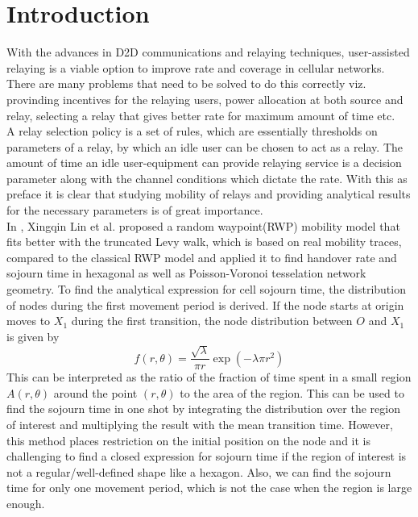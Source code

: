 \chapter{Introduction}
	With the advances in D2D communications and relaying techniques, user-assisted relaying is a viable option to improve rate and coverage in cellular networks. There are many problems that need to be solved to do this correctly viz. provinding incentives for the relaying users, power allocation at both source and relay, selecting a relay that gives better rate for maximum amount of time etc. \\ 


	A relay selection policy is a set of rules, which are essentially thresholds on parameters of a relay, by which an idle user can be chosen to act as a relay. The amount of time an idle user-equipment can provide relaying service is a decision parameter along with the channel conditions which dictate the rate. With this as preface it is clear that studying mobility of relays and providing analytical results for the necessary parameters is of great importance. \\
	
	
	In \cite{lin}, Xingqin Lin et al. proposed a random waypoint(RWP) mobility model that fits better with the truncated Levy walk, which is based on real mobility traces, compared to the classical RWP model and applied it to find handover rate and sojourn time in hexagonal as well as Poisson-Voronoi tesselation network geometry. To find the analytical expression for cell sojourn time, the distribution of nodes during the first movement period is derived. If the node starts at origin moves to $X_1$ during the first transition, the node distribution between $O$ and $X_1$ is given by 
	\begin{equation} \label{eq:nodeDist}
		f(r,\theta) = \frac{\sqrt{\lambda}}{\pi r} \exp(-\lambda \pi r^2)
	\end{equation}
	This can be interpreted as the ratio of the fraction of time spent in a small region $A(r,\theta)$ around the point $(r,\theta)$ to the area of the region. This can be used to find the sojourn time in one shot by integrating the distribution over the region of interest and multiplying the result with the mean transition time. However, this method places restriction on the initial position on the node and it is challenging to find a closed expression for sojourn time if the region of interest is not a regular/well-defined shape like a hexagon. Also, we can find the sojourn time for only one movement period, which is not the case when the region is large enough.     
	

